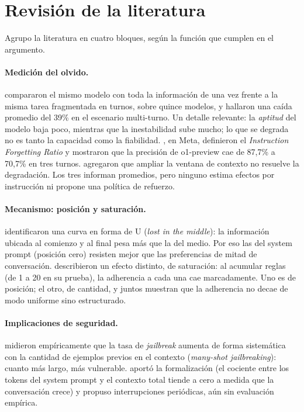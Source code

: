 \documentclass[12pt]{article}
\begin{document}
\section{Revisión de la literatura}

Agrupo la literatura en cuatro bloques, según la función que cumplen en el
argumento.

\paragraph{Medición del olvido.} \citet{laban2025} compararon el mismo modelo con
toda la información de una vez frente a la misma tarea fragmentada en turnos, sobre
quince modelos, y hallaron una caída promedio del 39\% en el escenario multi-turno. Un detalle relevante: la \emph{aptitud} del modelo baja
poco, mientras que la inestabilidad sube mucho; lo que se degrada no es tanto la
capacidad como la fiabilidad. \citet{he2024}, en Meta, definieron el
\emph{Instruction Forgetting Ratio} y mostraron que la precisión de o1-preview cae
de 87,7\% a 70,7\% en tres turnos. \citet{du2025} agregaron que ampliar la ventana
de contexto no resuelve la degradación. Los tres informan promedios, pero ninguno
estima efectos por instrucción ni propone una política de refuerzo.

\paragraph{Mecanismo: posición y saturación.} \citet{liu2024} identificaron una
curva en forma de U (\emph{lost in the middle}): la información ubicada al comienzo
y al final pesa más que la del medio. Por eso las del system prompt (posición
cero) resisten mejor que las preferencias de mitad de conversación. \citet{mu2025}
describieron un efecto distinto, de saturación: al acumular reglas (de 1 a 20 en su
prueba), la adherencia a cada una cae marcadamente. Uno es de posición; el otro, de
cantidad, y juntos muestran que la adherencia no decae de modo uniforme sino
estructurado.

\paragraph{Implicaciones de seguridad.} \citet{anil2024} midieron empíricamente
que la tasa de \emph{jailbreak} aumenta de forma sistemática con la cantidad de
ejemplos previos en el contexto (\emph{many-shot jailbreaking}): cuanto más largo,
más vulnerable. \citet{rivasseau2025} aportó la formalización (el cociente entre
los tokens del system prompt y el contexto total tiende a cero a medida que la
conversación crece) y propuso interrupciones periódicas, aún sin evaluación
empírica.
\end{document}
